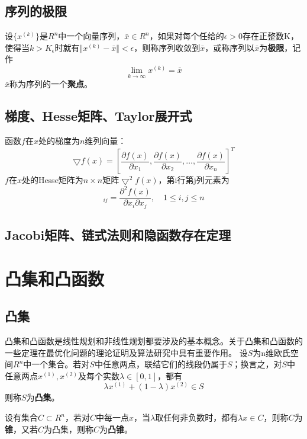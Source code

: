 \subsection*{序列的极限}

设$\{x^{(k)}\}$是$R^n$中一个向量序列，$\bar{x} \in R^n$，如果对每个任给的$\epsilon > 0$存在正整数K，使得当$k > K_\epsilon$时就有$\Vert x^{(k)} - \bar{x} \Vert < \epsilon $，则称序列收敛到$\bar{x}$，或称序列以$\bar{x}$为\textbf{极限}，记作
\begin{equation}
	\lim_{k \rightarrow \infty}x^{(k)} = \bar{x}
\end{equation}
$\bar{x}$称为序列的一个\textbf{聚点}。
\subsection*{梯度、Hesse矩阵、Taylor展开式}
函数$f$在$x$处的梯度为$n$维列向量：
\begin{equation}
	\bigtriangledown f(x) = \left[ \frac{\partial f(x)}{\partial x_1},\frac{\partial f(x)}{\partial x_2}, \dots ,\frac{\partial f(x)}{\partial x_n}\right]^T 
\end{equation}
$f$在$x$处的Hesse矩阵为$n \times n$矩阵$\bigtriangledown ^2  f(x)$，第i行第j列元素为
\begin{equation}
	[\bigtriangledown^2 f(x)]_{ij} = \frac{\partial ^2 f(x)}{\partial x_i \partial x_j},\quad 1 \leq i,j\leq n
\end{equation}
\subsection*{Jacobi矩阵、链式法则和隐函数存在定理 }
\section{凸集和凸函数}
\subsection*{凸集}
凸集和凸函数是线性规划和非线性规划都要涉及的基本概念。关于凸集和凸函数的一些定理在最优化问题的理论证明及算法研究中具有重要作用。
设$S$为n维欧氏空间$R^n$中一个集合。若对$S$中任意两点，联结它们的线段仍属于$S$；换言之，对$S$中任意两点$x^{(1)},x^{(2)}$及每个实数$\lambda\in [0,1]$，都有
\begin{equation}
	\lambda x^{(1)} + (1 - \lambda) x^{(2)}\in S
\end{equation}
则称$S$为\textbf{凸集}。

设有集合$C\subset R^n$，若对$C$中每一点$x$，当$\lambda$取任何非负数时，都有$\lambda x \in C$，则称$C$为\textbf{锥}，又若$C$为凸集，则称$C$为\textbf{凸锥}。

